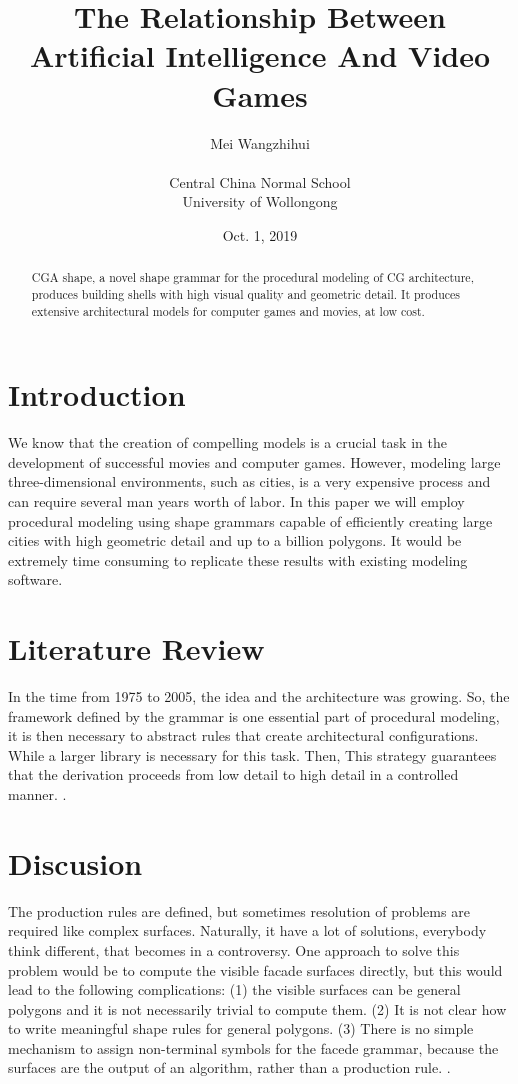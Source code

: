 \documentclass{article}
\title{The Relationship Between Artificial Intelligence And Video Games}
\author{ Mei Wangzhihui \\ \\
Central China Normal School\\
University of Wollongong
\\
}
\date{Oct. 1, 2019}
\begin{document}
\maketitle

\begin{abstract}
CGA shape, a novel shape grammar for the procedural modeling of
CG architecture, produces building shells with high visual quality
and geometric detail. It produces extensive architectural models for
computer games and movies, at low cost.
\end{abstract}

\section{Introduction}

We know that the creation of compelling models is a crucial task in the development of successful movies and computer games. However, modeling large three-dimensional environments, such as cities, is a very expensive process and can require several man years worth of labor. In this paper we will employ procedural modeling using shape
grammars capable of efficiently creating large cities with high geometric detail and up to a billion polygons. It would be extremely
time consuming to replicate these results with existing modeling
software.

\section{Literature Review}

In the time from 1975 to 2005, the idea and the architecture  was growing. So, the framework defined by the grammar is one essential
part of procedural modeling, it is then necessary to abstract
rules that create architectural configurations. While a larger library is necessary for this task. Then, This strategy guarantees that the derivation proceeds from low detail to high detail in a controlled manner. \cite{SIPSER}.

\section{Discusion}

The production rules are defined, but sometimes resolution of problems are required like complex surfaces.
Naturally, it have a lot of solutions, everybody think different, that becomes in a controversy. One approach to solve this
problem would be to compute the visible facade surfaces directly,
but this would lead to the following complications: (1) the visible
surfaces can be general polygons and it is not necessarily trivial
to compute them.
(2) It is not clear how to write
meaningful shape rules for general polygons. 
(3) There is no simple mechanism to assign non-terminal symbols for the facede grammar, because the surfaces are the output of an algorithm, rather than
a production rule. \cite{BibStyles}.
\end{document}
